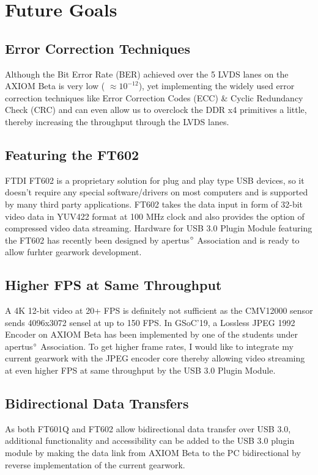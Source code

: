 \documentclass[11pt,oneside,fleqn]{book} %
\begin{document}
\chapter{Future Goals}
\section{Error Correction Techniques}
Although the Bit Error Rate (BER) achieved over the 5 LVDS lanes on the AXIOM Beta is very low ( ${\approx10^{-12}}$), yet implementing the widely used error correction techniques like Error Correction Codes (ECC) \& Cyclic Redundancy Check (CRC) and can even allow us to overclock the DDR x4 primitives a little, thereby increasing the throughput through the LVDS lanes. 
\section{Featuring the FT602}
FTDI FT602 is a proprietary solution for plug and play type USB devices, so it doesn’t require any special software/drivers on most computers and is supported by many third party applications. FT602 takes the data input in form of 32-bit video data in YUV422 format at 100 MHz clock and also provides the option of compressed video data streaming. Hardware for USB 3.0 Plugin Module featuring the FT602 has recently been designed by apertus$\degree$ Association and is ready to allow furhter gearwork development. 
\section {Higher FPS at Same Throughput} 
A 4K 12-bit video at 20+ FPS is definitely not sufficient as the CMV12000 sensor sends 4096x3072 sensel at up to 150 FPS. In GSoC'19, a Lossless JPEG 1992 Encoder on AXIOM Beta has been implemented by one of the students under apertus$\degree$ Association. To get higher frame rates, I would like to integrate my current gearwork with the JPEG encoder core thereby allowing video streaming at even higher FPS at same throughput by the USB 3.0 Plugin Module.
\section{Bidirectional Data Transfers}
As both FT601Q and FT602 allow bidirectional data transfer over USB 3.0, additional functionality and accessibility can be added to the USB 3.0 plugin module by making the data link from AXIOM Beta to the PC bidirectional by reverse implementation of the current gearwork. 
\end{document}
